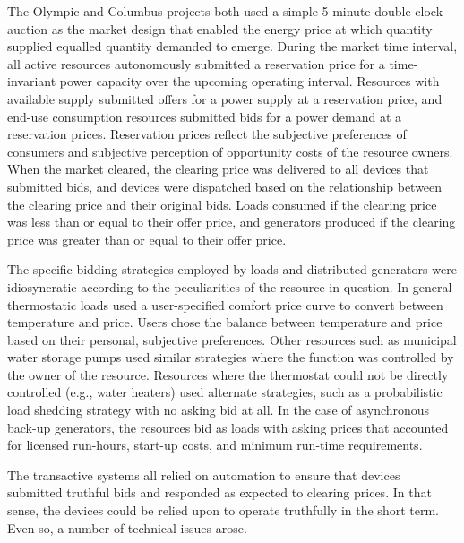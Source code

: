 \documentclass[10pt,twocolumn]{article}
\begin{document}
The Olympic and Columbus projects both used a simple 5-minute double clock auction as the market design that enabled the energy price at which quantity supplied equalled quantity demanded to emerge. During the market time interval, all active resources autonomously submitted a reservation price for a time-invariant power capacity over the upcoming operating interval. Resources with available supply submitted offers for a power supply at a reservation price, and end-use consumption resources submitted bids for a power demand at a reservation prices. Reservation prices reflect the subjective preferences of consumers and subjective perception of opportunity costs of the resource owners. When the market cleared, the clearing price was delivered to all devices that submitted bids, and devices were dispatched based on the relationship between the clearing price and their original bids. Loads consumed if the clearing price was less than or equal to their offer price, and generators produced if the clearing price was greater than or equal to their offer price.

The specific bidding strategies employed by loads and distributed generators were idiosyncratic according to the peculiarities of the resource in question.  In general thermostatic loads used a user-specified comfort price curve to convert between temperature and price. Users chose the balance between temperature and price based on their personal, subjective preferences. Other resources such as municipal water storage pumps used similar strategies where the function was controlled by the owner of the resource. Resources where the thermostat could not be directly controlled (e.g., water heaters) used alternate strategies, such as a probabilistic load shedding strategy with no asking bid at all.  In the case of asynchronous back-up generators, the resources bid as loads with asking prices that accounted for licensed run-hours, start-up costs, and minimum run-time requirements.

The transactive systems all relied on automation to ensure that devices submitted truthful bids and responded as expected to clearing prices.  In that sense, the devices could be relied upon to operate truthfully in the short term.  Even so, a number of technical issues arose.
\end{document}
